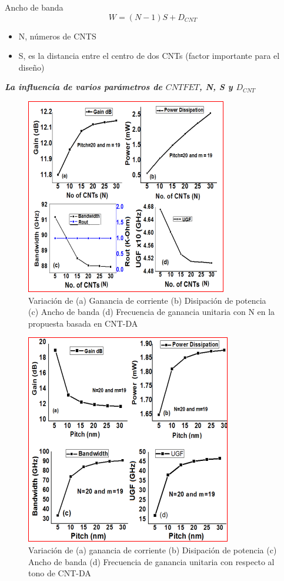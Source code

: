 \documentclass[aspectratio=169, 8pt]{beamer}
\begin{document}
\begin{frame}
\begin{block}{Ancho de banda}
	\begin{equation}
		W = (N-1)S+D_{CNT}
	\end{equation}
	\begin{itemize}
		\item N, números de CNTS
		\item S, es la distancia entre el centro de dos CNTs (factor importante para el diseño)
	\end{itemize}
	\textbf{\textit{La influencia de varios parámetros de $CNTFET$, N, S y $D_{CNT}$}}
\end{block}
\begin{figure}[!h] 
	\centering
	\includegraphics[scale=0.5]{IMAGENES/4.PNG}
	\caption{Variación de (a) Ganancia de corriente (b) Disipación de potencia (c) Ancho de banda (d) Frecuencia de ganancia unitaria con N en la propuesta basada en CNT-DA\cite{Akhoon}}
\end{figure}
\end{frame}


\begin{frame}
\begin{figure}[!h] 
	\centering
	\includegraphics[scale=0.8]{IMAGENES/5.PNG}
	\caption{Variación de (a) ganancia de corriente (b) Disipación de potencia (c) Ancho de banda (d) Frecuencia de ganancia unitaria con respecto al tono de CNT-DA \cite{Akhoon}}
\end{figure}
\end{frame}
\end{document}
